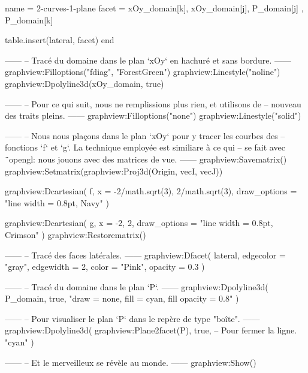 \documentclass[border = 3pt]{standalone}
\begin{document}
\begin{luadraw}{name = 2-curves-1-plane}
  facet = {
    xOy_domain[k], xOy_domain[j],
    P_domain[j]  , P_domain[k]
  }

  table.insert(lateral, facet)
end

------
-- Tracé du domaine dans le plan `xOy` en hachuré et sans bordure.
------
graphview:Filloptions("fdiag", "ForestGreen")
graphview:Linestyle("noline")
graphview:Dpolyline3d(xOy_domain, true)

------
-- Pour ce qui suit, nous ne remplissions plus rien, et utilisons de
-- nouveau des traits pleins.
------
graphview:Filloptions("none")
graphview:Linestyle("solid")

------
-- Nous nous plaçons dans le plan `xOy` pour y tracer les courbes des
-- fonctions  `f` et `g`. La technique employée est similiare à ce qui
-- se fait avec ¨opengl: nous jouons avec des matrices de vue.
------
graphview:Savematrix()
  graphview:Setmatrix(graphview:Proj3d({Origin, vecI, vecJ}))

  graphview:Dcartesian(
    f,
    {
      x = {-2/math.sqrt(3), 2/math.sqrt(3)},
      draw_options = "line width = 0.8pt, Navy"
    })

  graphview:Dcartesian(
    g,
    {
      x = {-2, 2},
      draw_options = "line width = 0.8pt, Crimson"
    })
graphview:Restorematrix()

------
-- Tracé des faces latérales.
------
graphview:Dfacet(
  lateral,
  {
    edgecolor = "gray",
    edgewidth = 2,
    color   = "Pink",
    opacity   = 0.3
  })

------
-- Tracé du domaine dans le plan `P`.
------
graphview:Dpolyline3d(
  P_domain,
  true,
  "draw = none, fill = cyan, fill opacity = 0.8"
)

------
-- Pour visualiser le plan `P` dans le repère de type "boîte".
------
graphview:Dpolyline3d(
  graphview:Plane2facet(P),
  true,   -- Pour fermer la ligne.
  "cyan"
)

------
-- Et le merveilleux se révèle au monde.
------
graphview:Show()
\end{luadraw}
\end{document}
